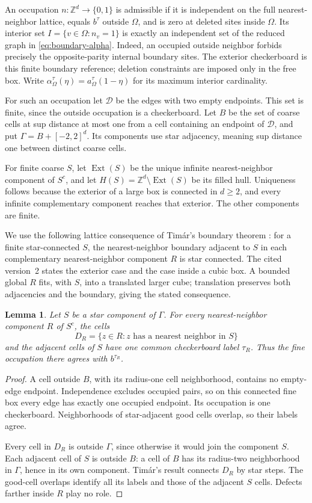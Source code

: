 \documentclass[11pt,a4paper]{article}
\newcommand{\Z}{\mathbb Z}
\DeclareMathOperator{\Ext}{Ext}
\newtheorem{lemma}[theorem]{Lemma}
\numberwithin{equation}{section}
\begin{document}
An occupation $n:\Z^d\to\{0,1\}$ is admissible if it is independent on
the full nearest-neighbor lattice, equals $b^\tau$ outside $\Omega$,
and is zero at deleted sites inside $\Omega$.
Its interior set $I=\{v\in\Omega:n_v=1\}$ is exactly an independent set
of the reduced graph in \eqref{eq:boundary-alpha}.
Indeed, an occupied outside neighbor forbids precisely the
opposite-parity internal boundary sites.
The exterior checkerboard is this finite boundary reference; deletion
constraints are imposed only in the free box.
Write $\alpha_\Omega^\tau(\eta)=a_\Omega^\tau(1-\eta)$ for its maximum
interior cardinality.

For such an occupation let $\mathcal D$ be the edges with two empty
endpoints. This set is finite, since the outside occupation is a
checkerboard. Let $B$ be the set of coarse cells at sup distance at most
one from a cell containing an endpoint of $\mathcal D$, and put
$\Gamma=B+[-2,2]^d$. Its components use star adjacency, meaning sup
distance one between distinct coarse cells.

For finite coarse $S$, let $\Ext(S)$ be the unique infinite
nearest-neighbor component of $S^c$, and let
$H(S)=\Z^d\setminus\Ext(S)$ be its filled hull.
Uniqueness follows because the exterior of a large box is connected
in $d\ge2$, and every infinite complementary component reaches that
exterior. The other components are finite.

We use the following lattice consequence of Tim\'ar's boundary theorem
\cite[Theorem~3]{Timar}: for a finite star-connected $S$, the
nearest-neighbor boundary adjacent to $S$ in each complementary
nearest-neighbor component $R$ is star connected.
The cited version~2 states the exterior case and the case inside a cubic
box. A bounded global $R$ fits, with $S$, into a translated larger cube;
translation preserves both adjacencies and the boundary, giving the
stated consequence.

\begin{lemma}\label{lem:collar}
Let $S$ be a star component of $\Gamma$. For every nearest-neighbor
component $R$ of $S^c$, the cells
\[
 D_R=\{z\in R:z\text{ has a nearest neighbor in }S\}
\]
and the adjacent cells of $S$ have one common checkerboard label
$\tau_R$. Thus the fine occupation there agrees with $b^{\tau_R}$.
\end{lemma}
\begin{proof}
A cell outside $B$, with its radius-one cell neighborhood, contains no
empty-edge endpoint. Independence excludes occupied pairs, so on this
connected fine box every edge has exactly one occupied endpoint.
Its occupation is one checkerboard. Neighborhoods of star-adjacent good
cells overlap, so their labels agree.

Every cell in $D_R$ is outside $\Gamma$, since otherwise it would join
the component $S$. Each adjacent cell of $S$ is outside $B$: a cell of
$B$ has its radius-two neighborhood in $\Gamma$, hence in its own
component. Tim\'ar's result connects $D_R$ by star steps. The good-cell
overlaps identify all its labels and those of the adjacent $S$ cells.
Defects farther inside $R$ play no role.
\end{proof}
\end{document}
